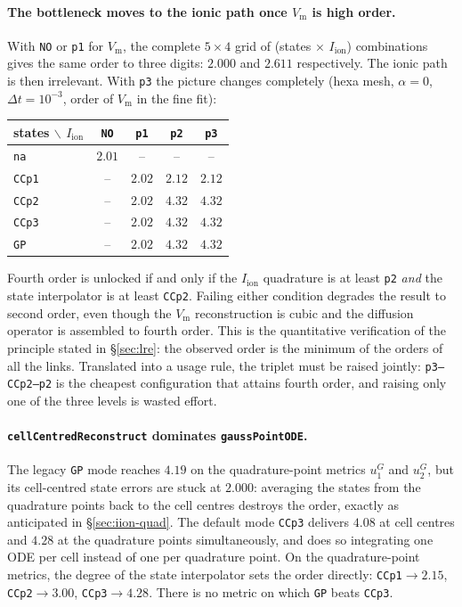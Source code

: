 \documentclass[11pt,a4paper]{article}
\newcommand{\code}[1]{\texttt{\small #1}}
\newcommand{\Vm}{V_{\text{m}}}
\newcommand{\Iion}{I_{\mathrm{ion}}}
\begin{document}
\paragraph{The bottleneck moves to the ionic path once $\Vm$ is high order.}
With \code{NO} or \code{p1} for $\Vm$, the complete $5\times4$ grid of
(states $\times$ $\Iion$) combinations gives the same order to three digits:
$2.000$ and $2.611$ respectively. The ionic path is then irrelevant. With
\code{p3} the picture changes completely (hexa mesh, $\alpha=0$,
$\Delta t=10^{-3}$, order of $\Vm$ in the fine fit):
\begin{center}
\begin{tabular}{@{}lcccc@{}}
\toprule
states $\backslash$ $\Iion$ & \code{NO} & \code{p1} & \code{p2} & \code{p3} \\
\midrule
\code{na}   & $2.01$ & --     & --     & --     \\
\code{CCp1} & --     & $2.02$ & $2.12$ & $2.12$ \\
\code{CCp2} & --     & $2.02$ & $\mathbf{4.32}$ & $\mathbf{4.32}$ \\
\code{CCp3} & --     & $2.02$ & $\mathbf{4.32}$ & $\mathbf{4.32}$ \\
\code{GP}   & --     & $2.02$ & $\mathbf{4.32}$ & $\mathbf{4.32}$ \\
\bottomrule
\end{tabular}
\end{center}
Fourth order is unlocked if and only if the $\Iion$ quadrature is at least
\code{p2} \emph{and} the state interpolator is at least \code{CCp2}. Failing
either condition degrades the result to second order, even though the $\Vm$
reconstruction is cubic and the diffusion operator is assembled to fourth order.
This is the quantitative verification of the principle stated in
\S\ref{sec:lre}: the observed order is the minimum of the orders of all the
links. Translated into a usage rule, the triplet must be raised jointly:
\code{p3--CCp2--p2} is the cheapest configuration that attains fourth order, and
raising only one of the three levels is wasted effort.

\paragraph{\code{cellCentredReconstruct} dominates \code{gaussPointODE}.}
The legacy \code{GP} mode reaches $4.19$ on the quadrature-point metrics
$u_1^G$ and $u_2^G$, but its cell-centred state errors are stuck at $2.000$:
averaging the states from the quadrature points back to the cell centres
destroys the order, exactly as anticipated in \S\ref{sec:iion-quad}. The default
mode \code{CCp3} delivers $4.08$ at cell centres and $4.28$ at the quadrature
points simultaneously, and does so integrating one ODE per cell instead of one
per quadrature point. On the quadrature-point metrics, the degree of the state
interpolator sets the order directly: \code{CCp1}$\to2.15$,
\code{CCp2}$\to3.00$, \code{CCp3}$\to4.28$. There is no metric on which
\code{GP} beats \code{CCp3}.
\end{document}
